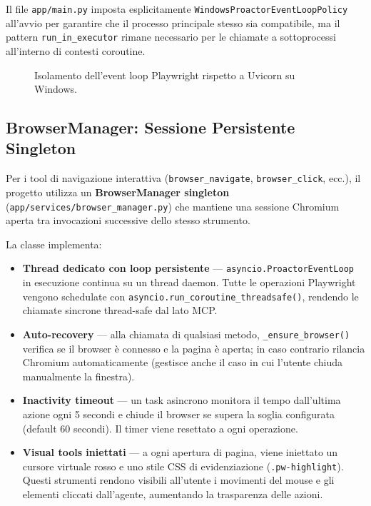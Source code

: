 Il file \texttt{app/main.py} imposta esplicitamente
\texttt{WindowsProactorEventLoopPolicy} all'avvio per garantire che
il processo principale stesso sia compatibile, ma il pattern
\texttt{run\_in\_executor} rimane necessario per le chiamate a
sottoprocessi all'interno di contesti coroutine.

\begin{figure}[htbp]
    \centering
    \caption{Isolamento dell'event loop Playwright rispetto a Uvicorn
    su Windows.}
    \label{fig:pw-eventloop}
\end{figure}

\subsection{BrowserManager: Sessione Persistente Singleton}
\label{subsec:pw-browsermanager}

Per i tool di navigazione interattiva (\texttt{browser\_navigate},
\texttt{browser\_click}, ecc.), il progetto utilizza un
\textbf{BrowserManager singleton} (\texttt{app/services/browser\_manager.py})
che mantiene una sessione Chromium aperta tra invocazioni successive
dello stesso strumento.

La classe implementa:

\begin{itemize}
    \item \textbf{Thread dedicato con loop persistente} —
        \texttt{asyncio.ProactorEventLoop} in esecuzione continua su un
        thread daemon. Tutte le operazioni Playwright vengono schedulate
        con \texttt{asyncio.run\_coroutine\_threadsafe()}, rendendo le
        chiamate sincrone thread-safe dal lato MCP.
    \item \textbf{Auto-recovery} — alla chiamata di qualsiasi metodo,
        \texttt{\_ensure\_browser()} verifica se il browser è connesso
        e la pagina è aperta; in caso contrario rilancia Chromium
        automaticamente (gestisce anche il caso in cui l'utente chiuda
        manualmente la finestra).
    \item \textbf{Inactivity timeout} — un task asincrono monitora il
        tempo dall'ultima azione ogni 5 secondi e chiude il browser se
        supera la soglia configurata (default 60 secondi). Il timer viene
        resettato a ogni operazione.
    \item \textbf{Visual tools iniettati} — a ogni apertura di pagina,
        viene iniettato un cursore virtuale rosso e uno stile CSS di
        evidenziazione (\texttt{.pw-highlight}). Questi strumenti
        rendono visibili all'utente i movimenti del mouse e gli elementi
        cliccati dall'agente, aumentando la trasparenza delle azioni.
\end{itemize}

